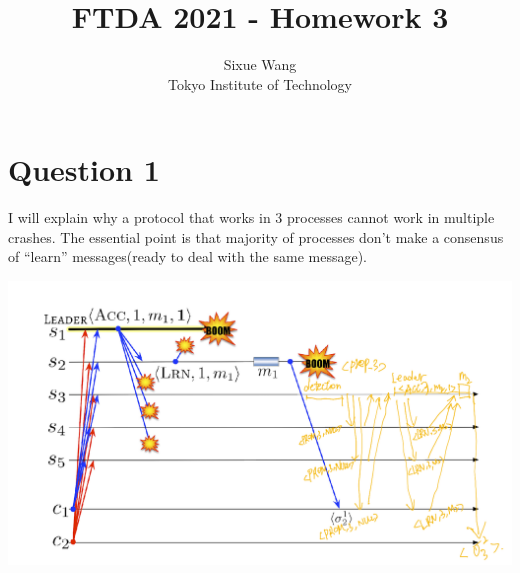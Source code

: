 \documentclass{article}
\title{FTDA 2021 - Homework 3}
\author{Sixue Wang\\Tokyo Institute of Technology}
\begin{document}
\maketitle

\section*{Question 1}
I will explain why a protocol that works in 3 processes cannot work in multiple crashes. The essential point is that majority of processes don't make a consensus of ``learn'' messages(ready to deal with the same message).

\includegraphics[width=\textwidth]{hw3_1}
\end{document}
